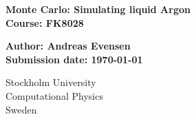 \thispagestyle{empty}
\begin{titlepage}
   \begin{center}
       \huge
       \textbf{Monte Carlo: Simulating liquid Argon}\\
       \vspace*{1cm}
       \textbf{Course: FK8028}
       \large

       \vspace*{0.5cm}
       \textbf{Author: Andreas Evensen}\\
       \vspace*{.5cm}
       \small
       \vspace*{1.cm}
       \textbf{Submission date: \today}\\
       \vspace*{.5cm}
       \vspace{0.8cm}
     
       \small
       Stockholm University\\
       Computational Physics\\
       Sweden\\
   \end{center}
\end{titlepage}